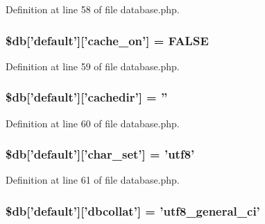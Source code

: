 Definition at line 58 of file database.\-php.

\hypertarget{production_2database_8php_a05a82adb11460f351c1df4ae9be71866}{
\subsubsection[{\$db}]{\setlength{\rightskip}{0pt plus 5cm}\$db\mbox{[}'default'\mbox{]}\mbox{[}'cache\-\_\-on'\mbox{]} = F\-A\-L\-S\-E}}\label{production_2database_8php_a05a82adb11460f351c1df4ae9be71866}


Definition at line 59 of file database.\-php.

\hypertarget{production_2database_8php_a12683252490249e3294aebaca97c4126}{
\subsubsection[{\$db}]{\setlength{\rightskip}{0pt plus 5cm}\$db\mbox{[}'default'\mbox{]}\mbox{[}'cachedir'\mbox{]} = ''}}\label{production_2database_8php_a12683252490249e3294aebaca97c4126}


Definition at line 60 of file database.\-php.

\hypertarget{production_2database_8php_a581bc2f1f3fa806239c44e2c2293dc59}{
\subsubsection[{\$db}]{\setlength{\rightskip}{0pt plus 5cm}\$db\mbox{[}'default'\mbox{]}\mbox{[}'char\-\_\-set'\mbox{]} = 'utf8'}}\label{production_2database_8php_a581bc2f1f3fa806239c44e2c2293dc59}


Definition at line 61 of file database.\-php.

\hypertarget{production_2database_8php_ab03697bf8340acfa74bf20c952aa81c7}{
\subsubsection[{\$db}]{\setlength{\rightskip}{0pt plus 5cm}\$db\mbox{[}'default'\mbox{]}\mbox{[}'dbcollat'\mbox{]} = 'utf8\-\_\-general\-\_\-ci'}}\label{production_2database_8php_ab03697bf8340acfa74bf20c952aa81c7}



